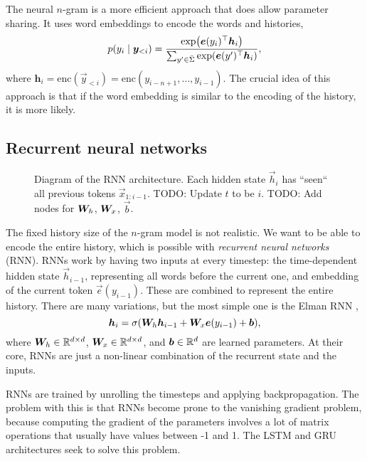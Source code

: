 The neural $n$-gram \citep{bengio2000neural} is a more efficient approach that does allow parameter
sharing. It uses word embeddings to encode the words and
histories, \[
  p(y_i\mid \bm{y}_{<i}) = \frac{\exp \lft( \transpose{\vec{e}(y_i)} \vec{h}_i \rgt)}{\sum_{y'\in\bar{\Sigma}} \exp \lft( \transpose{\vec{e}(y')} \vec{h}_i \rgt)}
,\]
where $\bm{h}_i = \mathrm{enc}(\vec{y}_{<i}) =
\text{enc}(y_{i-n+1},\ldots,y_{i-1})$. The crucial idea of this approach is that if the word embedding
is similar to the encoding of the history, it is more likely.

\subsection{Recurrent neural networks}

\begin{figure}[ht]
    \centering
    \caption{Diagram of the RNN architecture. Each hidden state $\vec{h}_i$ has
    ``seen`` all previous tokens $\vec{x}_{1:{i-1}}$. TODO: Update $t$ to be
    $i$. TODO: Add nodes for $\bm{W}_h$, $\bm{W}_x$, $\vec{b}$.}
    \label{fig:rnn}
\end{figure}

The fixed history size of the $n$-gram model is not realistic. We want to be
able to encode the entire history, which is possible with \textit{recurrent
neural networks} (RNN). RNNs work by having two inputs at every timestep: the
time-dependent hidden state $\vec{h}_{i-1}$, representing all words before the
current one, and embedding of the current token $\vec{e}(y_{i-1})$. These are
combined to represent the entire history. There are many variations, but the
most simple one is the Elman RNN \citep{elman1990finding}, \[
  \vec{h}_i = \sigma \lft( \mat{W}_h \vec{h}_{i-1} + \mat{W}_x \vec{e}(y_{i-1}) + \vec{b} \rgt)
,\] 
where $\bm{W}_h \in \mathbb{R}^{d\times d}$, $\bm{W}_x \in \mathbb{R}^{d\times d}$, and
$\bm{b} \in \mathbb{R}^d$ are learned parameters. At their core, RNNs are just a
non-linear combination of the recurrent state and the inputs.

RNNs are trained by unrolling the timesteps and applying backpropagation. The
problem with this is that RNNs become prone to the vanishing gradient problem,
because computing the gradient of the parameters involves a lot of matrix
operations that usually have values between -1 and 1. The LSTM
\citep{hochreiter1997long} and GRU \citep{cho2014learning} architectures seek
to solve this problem.

